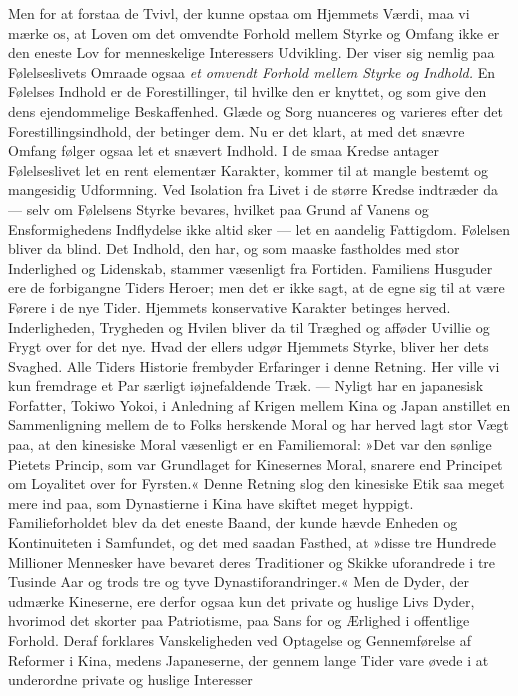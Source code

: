 \documentclass[12pt,a4paper]{article}
\newcommand{\opage}[1]{\marginnote{\footnotesize\textit{[#1]}}}
\begin{document}
Men for at forstaa de Tvivl, der kunne opstaa om Hjemmets
\opage{8}Værdi, maa vi mærke
os, at Loven om det omvendte Forhold mellem Styrke og Omfang ikke er den
eneste Lov for menneskelige Interessers Udvikling. Der viser sig nemlig paa
Følelseslivets Omraade ogsaa \emph{et omvendt Forhold mellem Styrke og Indhold.} En
Følelses Indhold er de Forestillinger, til hvilke den er knyttet, og som give
den dens ejendommelige Beskaffenhed. Glæde og Sorg nuanceres og varieres efter
det Forestillingsindhold, der betinger dem. Nu er det klart, at med det snævre
Omfang følger ogsaa let et snævert Indhold. I de smaa Kredse antager
Følelseslivet let en rent elementær Karakter, kommer til at mangle bestemt og
mangesidig Udformning. Ved Isolation fra Livet i de større Kredse indtræder da
--- selv om Følelsens Styrke bevares, hvilket paa Grund af Vanens og
Ensformighedens Indflydelse ikke altid sker --- let en aandelig Fattigdom.
Følelsen bliver da blind. Det Indhold, den har, og som maaske fastholdes med
stor Inderlighed og Lidenskab, stammer væsenligt fra Fortiden. Familiens
Husguder ere de forbigangne Tiders Heroer; men det er ikke sagt, at de egne
sig til at være Førere i de nye Tider. Hjemmets konservative Karakter betinges
herved. Inderligheden, Trygheden og Hvilen bliver da til Træghed og afføder
Uvillie og Frygt over for det nye. Hvad der ellers udgør Hjemmets Styrke,
bliver her dets Svaghed. Alle Tiders Historie frembyder Erfaringer i denne
Retning. Her ville vi kun fremdrage et Par særligt iøjnefaldende Træk. ---
Nyligt har en japanesisk Forfatter, Tokiwo Yokoi, i Anledning af Krigen mellem
Kina og Japan anstillet en Sammenligning mellem de to Folks herskende Moral og
har herved lagt stor Vægt paa, at den kinesiske Moral væsenligt er en
Familiemoral: »Det var den sønlige Pietets Princip, som var Grundlaget for
Kinesernes Moral, snarere end Principet om Loyalitet over for Fyrsten.« Denne
Retning slog den kinesiske Etik saa meget mere ind paa, som Dynastierne i Kina
have skiftet meget hyppigt. Familieforholdet blev da det eneste Baand, der
kunde hævde Enheden og Kontinuiteten i Samfundet, og det med saadan Fasthed,
at »disse tre Hundrede Millioner Mennesker have bevaret deres Traditioner og
Skikke uforandrede i tre Tusinde Aar og trods tre og tyve
Dynastiforandringer.« Men de Dyder, der udmærke Kineserne, ere derfor ogsaa
kun det private og huslige Livs Dyder, hvorimod det skorter paa Patriotisme,
paa Sans for og Ærlighed i offentlige Forhold. Deraf forklares Vanskeligheden
ved Optagelse og Gennemførelse af Reformer i Kina, medens Japaneserne, der
gennem lange Tider vare øvede i at underordne private og huslige Interesser
\end{document}
